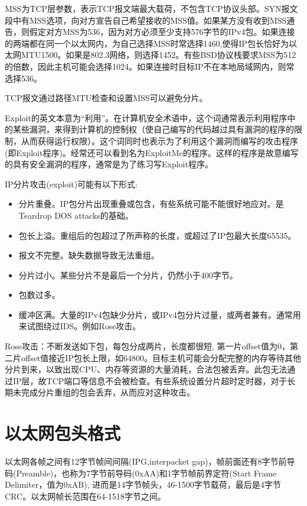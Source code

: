 MSS为TCP层参数，表示TCP报文端最大载荷，不包含TCP协议头部。SYN报文段中有MSS选项，向对方宣告自己希望接收的MSS值。如果某方没有收到MSS通告，则假定对方MSS为536，因为对方必须至少支持576字节的IPv4包。如果连接的两端都在同一个以太网内，为自己选择MSS时常选择1460,使得IP包长恰好为以太网MTU1500。如果是802.3网络，则选择1452。有些BSD协议栈要求MSS为512的倍数，因此主机可能会选择1024。如果连接时目标IP不在本地局域网内，则常选择536。

TCP报文通过路径MTU检查和设置MSS可以避免分片。

Exploit的英文本意为“利用”。在计算机安全术语中，这个词通常表示利用程序中的某些漏洞，来得到计算机的控制权（使自己编写的代码越过具有漏洞的程序的限制，从而获得运行权限）。这个词同时也表示为了利用这个漏洞而编写的攻击程序(即Exploit程序)。经常还可以看到名为ExploitMe的程序。这样的程序是故意编写的具有安全漏洞的程序，通常是为了练习写Exploit程序。

IP分片攻击(exploit)可能有以下形式\cite{wikipedia}:
\begin{itemize}
    \item 分片重叠。IP包分片出现重叠或包含，有些系统可能不能很好地应对。是Teardrop DOS attacks的基础。
    \item 包长上溢。重组后的包超过了所声称的长度，或超过了IP包最大长度65535。
    \item 报文不完整。缺失数据导致无法重组。
    \item 分片过小。某些分片不是最后一个分片，仍然小于400字节。
    \item 包数过多。
    \item 缓冲区满。大量的IPv4包缺少分片，或IPv4包分片过量，或两者兼有。通常用来试图绕过IDS。例如Rose攻击。
\end{itemize}

Rose攻击：不断发送如下包，每包分成两片，长度都很短, 第一片offset值为0，第二片offset值接近IP包长上限，如64800。目标主机可能会分配完整的内存等待其他分片到来，以致出现CPU、内存等资源的大量消耗，合法包被丢弃。此包无法通过IP层，故TCP端口等信息不会被检查。有些系统设置分片超时定时器，对于长期未完成分片重组的包会丢弃，从而应对这种攻击。






\section{以太网包头格式}
以太网各帧之间有12字节帧间间隔(IPG,interpacket gap)，帧前面还有8字节前导码(Preamble)，也称为7字节前导码(0xAA)和1字节帧前界定符(Start Frame Delimiter，值为0xAB), 进而是14字节帧头，46-1500字节载荷，最后是4字节CRC。以太网帧长范围在64-1518字节之间。

